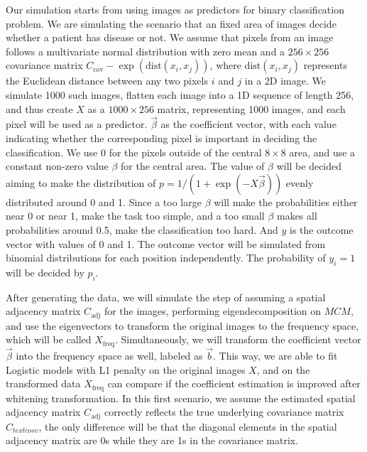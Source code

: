 \documentclass[12pt]{article}
\begin{document}
Our simulation starts from using images as predictors for binary classification problem. We are simulating the scenario that an fixed area of images decide whether a patient has disease or not. We assume that pixels from an image follows a multivariate normal distribution with zero mean and a \( 256 \times 256 \) covariance matrix \( C_{\text{cov}} - \exp (\text{dist} (x_i, x_j )) \), where \( \text{dist}(x_i, x_j) \) represents the Euclidean distance between any two pixels \( i \) and \( j \) in a 2D image. We simulate 1000 such images, flatten each image into a 1D sequence of length 256, and thus create \( X \) as a \( 1000 \times 256 \) matrix, representing 1000 images, and each pixel will be used as a predictor. \( \vec{\beta} \) as the coefficient vector, with each value indicating whether the corresponding pixel is important in deciding the classification. We use 0 for the pixels outside of the central \( 8 \times 8 \) area, and use a constant non-zero value \( \beta \) for the central area. The value of \( \beta \) will be decided aiming to make the distribution of \( p = 1 / (1 + \exp (- X \vec{\beta})) \) evenly distributed around 0 and 1. Since a too large \( \beta \) will make the probabilities either near 0 or near 1, make the task too simple, and a too small \( \beta \) makes all probabilities around 0.5, make the classification too hard.
And \( y \) is the outcome vector with values of 0 and 1. The outcome vector will be simulated from binomial distributions for each position independently. The probability of \( y_i = 1 \) will be decided by \( p_i \).

After generating the data, we will simulate the step of assuming a spatial adjacency matrix \( C_{\text{adj}} \) for the images, performing eigendecomposition on \( M C M \), and use the eigenvectors to transform the original images to the frequency space, which will be called \( X_{\text{freq}} \). Simultaneously, we will transform the coefficient vector \( \vec{\beta} \) into the frequency space as well, labeled as \( \vec{b} \). This way, we are able to fit Logistic models with L1 penalty on the original images \( X \), and on the transformed data \( X_{\text{freq}} \) can compare if the coefficient estimation is improved after whitening transformation. In this first scenario, we assume the estimated spatial adjacency matrix \( C_{\text{adj}} \) correctly reflects the true underlying covariance matrix \( C_{text{cosv}} \), the only difference will be that the diagonal elements in the spatial adjacency matrix are 0s while they are 1s in the covariance matrix.
\end{document}
